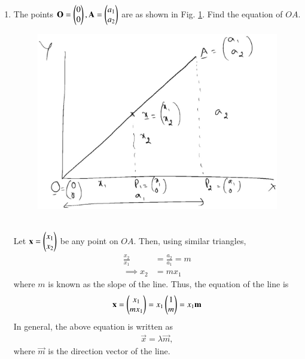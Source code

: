 \renewcommand{\theequation}{\theenumi}
\begin{enumerate}[label=\arabic*.,ref=\thesubsection.\theenumi]
\item The points $\mathbf{O}=\begin{pmatrix}0\\0\end{pmatrix},\mathbf{A}=\begin{pmatrix}a_1\\a_2\end{pmatrix}$ are as shown in Fig. \ref{fig:line_homog}. 
Find the equation of  $OA$. 
\begin{figure}
\centering
\includegraphics[width=\columnwidth]{./line/figs/line_homog.eps}
\caption{}
\label{fig:line_homog}
\end{figure}
\\
\solution
Let $\mathbf{x}=\begin{pmatrix}x_1\\x_2\end{pmatrix}$ be any point on $OA$.
Then, using similar triangles,
\begin{align}
\frac{x_2}{x_1} &= \frac{a_2}{a_1} = m
\\
\implies x_2 &=  m x_1
\end{align}
where $m$ is known as the slope of the line. Thus, the equation of the line is
\begin{align}
\mathbf{x} = \begin{pmatrix}x_1\\m x_1\end{pmatrix} = x_1 \begin{pmatrix}1 \\ m\end{pmatrix} = x_1\mathbf{m}
\end{align}
In general, the above equation is written as
\begin{align}
\label{eq:homog}
\vec{x} = \lambda \vec{m},
\end{align}
%
where $\vec{m}$ is the direction vector of the line.


\end{enumerate}
